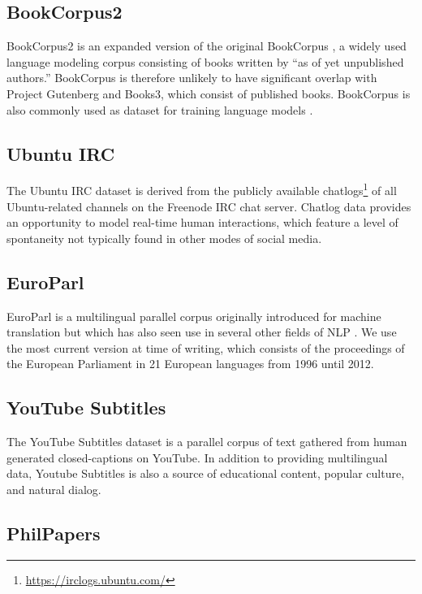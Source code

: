 \documentclass[11pt,a4paper]{article}
\begin{document}
\subsection{BookCorpus2}

BookCorpus2 is an expanded version of the original BookCorpus \citep{BookCorpus}, a widely used language modeling corpus consisting of books written by ``as of yet unpublished authors.'' BookCorpus is therefore unlikely to have significant overlap with Project Gutenberg and Books3, which consist of published books. BookCorpus is also commonly used as dataset for training language models \citep{GPT, BERT, RoBERTa}.

\subsection{Ubuntu IRC}

The Ubuntu IRC dataset is derived from the publicly available chatlogs\footnote{\url{https://irclogs.ubuntu.com/}} of all Ubuntu-related channels on the Freenode IRC chat server. Chatlog data provides an opportunity to model real-time human interactions, which feature a level of spontaneity not typically found in other modes of social media. 

\subsection{EuroParl}

EuroParl \citep{EuroParl} is a multilingual parallel corpus originally introduced for machine translation but which has also seen use in several other fields of NLP \citep{EuroParl-example1,EuroParl-example2,EuroParl-example3}. We use the most current version at time of writing, which consists of the proceedings of the European Parliament in 21 European languages from 1996 until 2012.

\subsection{YouTube Subtitles}

The YouTube Subtitles dataset is a parallel corpus of text gathered from human generated closed-captions on YouTube. In addition to providing multilingual data, Youtube Subtitles is also a source of educational content, popular culture, and natural dialog.

\subsection{PhilPapers}
\end{document}
